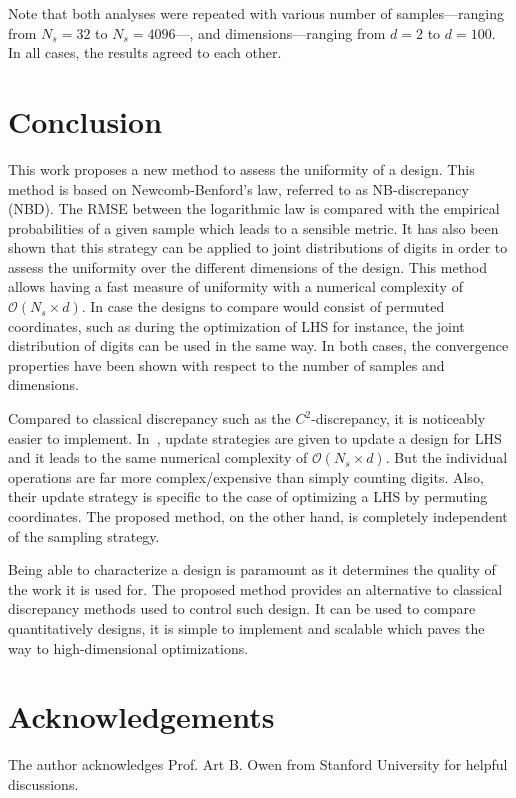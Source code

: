 \documentclass[1p,authoryear]{elsarticle}
\begin{document}
Note that both analyses were repeated with various number of samples---ranging from $N_s=32$ to $N_s=4096$---, and dimensions---ranging from $d=2$ to $d=100$. In all cases, the results agreed to each other.


\cleardoublepage
\section{Conclusion}\label{sec:conclusion}


This work proposes a new method to assess the uniformity of a design. This method is based on Newcomb-Benford's law, referred to as NB-discrepancy (NBD). The RMSE between the logarithmic law is compared with the empirical probabilities of a given sample which leads to a sensible metric. It has also been shown that this strategy can be applied to joint distributions of digits in order to assess the uniformity over the different dimensions of the design. This method allows having a fast measure of uniformity with a numerical complexity of $\mathcal{O}(N_s \times d)$. In case the designs to compare would consist of permuted coordinates, such as during the optimization of LHS for instance, the joint distribution of digits can be used in the same way. In both cases, the convergence properties have been shown with respect to the number of samples and dimensions.

Compared to classical discrepancy such as the $C^2$-discrepancy, it is noticeably easier to implement. In~\citep{Fang2006}, update strategies are given to update a design for LHS and it leads to the same numerical complexity of $\mathcal{O}(N_s \times d)$. But the individual operations are far more complex/expensive than simply counting digits. Also, their update strategy is specific to the case of optimizing a LHS by permuting coordinates. The proposed method, on the other hand, is completely independent of the sampling strategy.

Being able to characterize a design is paramount as it determines the quality of the work it is used for. The proposed method provides an alternative to classical discrepancy methods used to control such design. It can be used to compare quantitatively designs, it is simple to implement and scalable which paves the way to high-dimensional optimizations.


\section*{Acknowledgements}
The author acknowledges Prof. Art B. Owen from Stanford University for helpful discussions.


\end{document}
